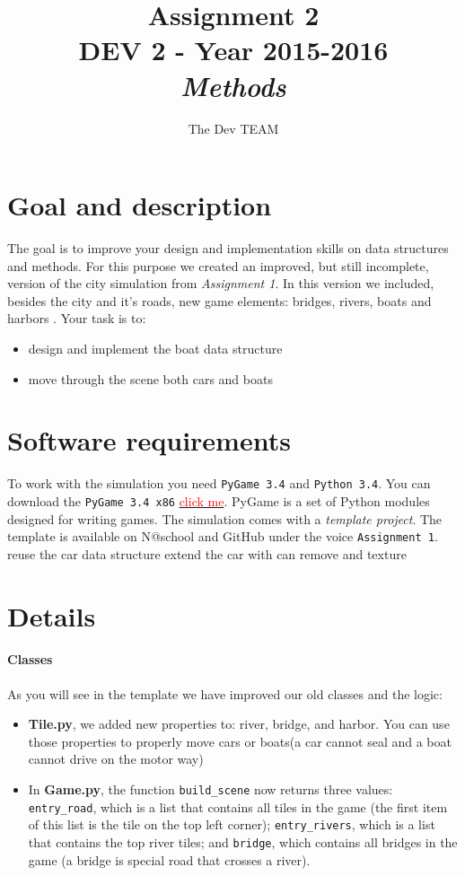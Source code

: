 \documentclass[10pt,a4paper]{article}
\begin{document}
\title{Assignment 2\\DEV 2 - Year 2015-2016\\\textit{Methods}}
\author{The Dev TEAM}
\maketitle


\section{Goal and description}
The goal is to improve your design and implementation skills on data structures and methods. For this purpose we created an improved, but still incomplete, version of the city simulation from \textit{Assignment 1}. In this version we included, besides the city and it's roads, new game elements: bridges, rivers, boats and harbors . Your task is to:
\begin{itemize}
\item design and implement the boat data structure  
\item move through the scene both cars and boats
\end{itemize}
	
	
\section{Software requirements}
To work with the simulation you need \texttt{PyGame 3.4} and \texttt{Python 3.4}. You can download the \texttt{PyGame 3.4 x86} \href{https://bitbucket.org/pygame/pygame/downloads/pygame-1.9.2a0-hg_ea3b3bb8714a.win32-py3.4.msi}{\textcolor{red}{click me}}. PyGame is a set of Python modules designed for writing games.	The simulation comes with a \textit{template project}. The template is available on N@school and GitHub under the voice \texttt{Assignment 1}.
reuse the car data structure 
extend the car with can remove and texture
\section{Details}

\paragraph{Classes}
As you will see in the template we have improved our old classes and the logic:

\begin{itemize}
	\item \textbf{Tile.py}, we added new properties to: river, bridge, and harbor. You can use those properties to properly move cars or boats(a car cannot seal and a boat cannot drive on the motor way)
	
	\item In \textbf{Game.py}, the function \texttt{build\_scene} now returns three values: \texttt{entry\_road}, which is a list that contains all tiles in the game (the first item of this list is the tile on the top left corner); \texttt{entry\_rivers}, which is a list that contains the top river tiles; and \texttt{bridge}, which contains all bridges in the game (a bridge is special road that crosses a river).
\end{itemize} 
\end{document}
